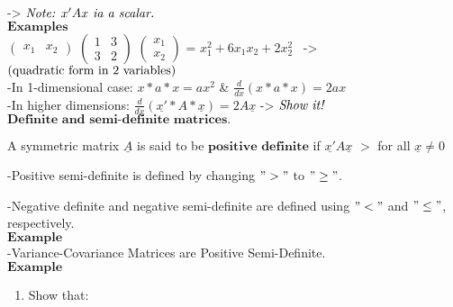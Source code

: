 \documentclass[]{article}
\providecommand{\tightlist}{%
  \setlength{\itemsep}{0pt}\setlength{\parskip}{0pt}}
\begin{document}
-\textgreater{} \(\text{\textit{Note: $x'Ax$ ia a scalar.}}\)\\

\(\mathbf{Examples}\)\\

\(\begin{pmatrix} x_1 & x_2 \end{pmatrix}\)
\(\begin{pmatrix} 1 & 3 \\ 3 & 2 \end{pmatrix}\)
\(\begin{pmatrix} x_1 \\ x_2 \end{pmatrix}\) =
\({x^{2}_1 + 6x_1x_2 + 2x^{2}_2}\)~
-\textgreater{}\(\text{\text{(quadratic form in 2 variables)}}\)\\

-In 1-dimensional case: \(x*a*x = ax^2\) \&
\(\frac{d}{dx}(x*a*x)=2ax\)\\

-In higher dimensions:
\(\frac{d}{dx}(\underline{x'}*A*\underline{x})=2A\underline{x}\)
-\textgreater{} \(\text{\textit{Show it!}}\)\\

\(\textbf{Definite and semi-definite matrices.}\)\\

\begin{tcolorbox}[colback=green!5,colframe=red!40!black,title=Definition]
A symmetric matrix $\underline{A}$ is said to be $\textbf{positive definite}$ if $\underline{x'}A\underline{x}$  $>$ for all $\underline{x}\neq0$



\end{tcolorbox}

-Positive semi-definite is defined by changing \(">"\) to \("\geq"\).

-Negative definite and negative semi-definite are defined using \("<"\)
and \("\leq"\), respectively.\\

\(\mathbf{Example}\)\\

-Variance-Covariance Matrices are Positive Semi-Definite.\\

\(\mathbf{Example}\)\\

\begin{enumerate}
\def\labelenumi{\alph{enumi})}
\tightlist
\item
  Show that:\\
\end{enumerate}
\end{document}
